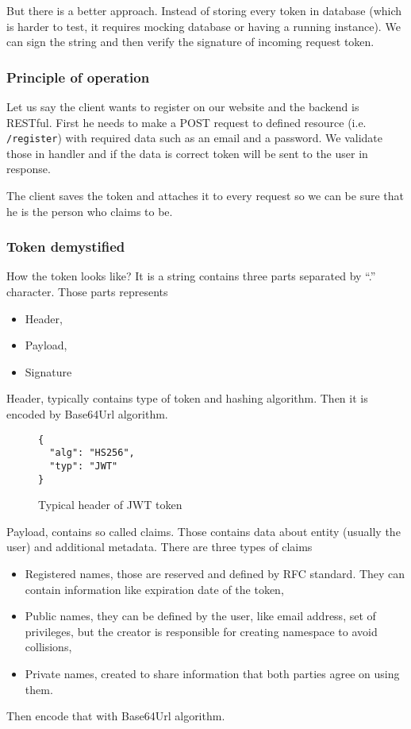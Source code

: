 But there is a better approach. Instead of storing every token in database (which is harder to test, it requires mocking database or having a running instance). We can sign the string and then verify the signature of incoming request token.

\subsubsection{Principle of operation}
Let us say the client wants to register on our website and the backend is RESTful. First he needs to make a POST request to defined resource (i.e. \verb|/register|) with required data such as an email and a password. We validate those in handler and if the data is correct token will be sent to the user in response.

The client saves the token and attaches it to every request so we can be sure that he is the person who claims to be.

\subsubsection{Token demystified}
How the token looks like? It is a string contains three parts separated by ``.'' character\cite{JWT-introduction}. Those parts represents
\begin{itemize}
\item Header,
\item Payload,
\item Signature
\end{itemize}

Header, typically contains type of token and hashing algorithm. Then it is encoded by Base64Url algorithm.
\begin{figure}[!htbp]
\begin{verbatim}
{
  "alg": "HS256",
  "typ": "JWT"
}
\end{verbatim}
\caption{Typical header of JWT token}
\label{src:typical-header}
\end{figure}

Payload, contains so called claims. Those contains data about entity (usually the user) and additional metadata. There are three types of claims
\begin{itemize}
\item Registered names, those are reserved and defined by RFC standard. They can contain information like expiration date of the token\cite{JWT-rfc},
\item Public names, they can be defined by the user, like email address, set of privileges, but the creator is responsible for creating namespace to avoid collisions,
\item Private names, created to share information that both parties agree on using them.
\end{itemize}
Then encode that with Base64Url algorithm.

